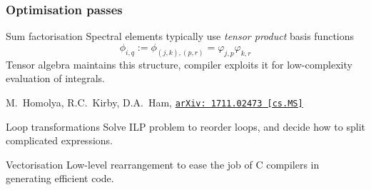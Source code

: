 \documentclass[presentation, 10pt]{beamer}
\newcommand{\arxivlink}[2]{%
  \href{https://www.arxiv.org/abs/#1}%
  {\texttt{arXiv:\,#1\,[#2]}}%
}
\begin{document}
\begin{frame}[t]
  \frametitle{Optimisation passes}
  \begin{block}{Sum factorisation}
    \vspace{0.25\baselineskip}
    Spectral elements typically use \emph{tensor product} basis functions
    \begin{equation*}
      \phi_{i,q} := \phi_{(j,k),(p,r)} = \varphi_{j,p}\varphi_{k,r}
    \end{equation*}
    Tensor algebra maintains this structure, compiler exploits it for
    low-complexity evaluation of integrals.
    \vspace{-\baselineskip}
    \begin{flushright}
      {\scriptsize M.~Homolya, R.C.~Kirby, D.A.~Ham, \arxivlink{1711.02473}{cs.MS}\nocite{Homolya:2017a}}
    \end{flushright}
  \end{block}
  \vspace{-0.5\baselineskip}
  \begin{block}{Loop transformations}
    \vspace{0.25\baselineskip}
    Solve ILP problem to reorder loops, and decide how to split
    complicated expressions.\nocite{Luporini:2017}
  \end{block}
  \begin{block}{Vectorisation}
    \vspace{0.25\baselineskip}
    Low-level rearrangement to ease the job of C compilers in
    generating efficient code.\nocite{Luporini:2015}
  \end{block}

\end{frame}
\end{document}
